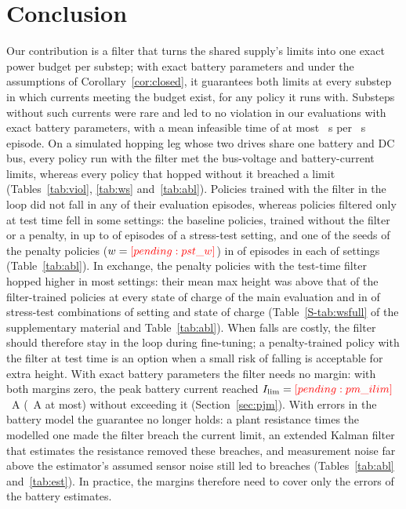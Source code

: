 \section{Conclusion}\label{sec:conclusion}
Our contribution is a filter that turns the shared supply's limits into one exact power budget per substep; with exact battery parameters and under the assumptions of Corollary~\ref{cor:closed}, it guarantees both limits at every substep in which currents meeting the budget exist, for any policy it runs with. Substeps without such currents were rare and led to no violation in our evaluations with exact battery parameters, with a mean infeasible time of at most ~s per ~s episode. On a simulated hopping leg whose two drives share one battery and DC bus, every policy run with the filter met the bus-voltage and battery-current limits, whereas every policy that hopped without it breached a limit (Tables~\ref{tab:viol}, \ref{tab:ws} and~\ref{tab:abl}). Policies trained with the filter in the loop did not fall in any of their  evaluation episodes, whereas policies filtered only at test time fell in some settings: the baseline policies, trained without the filter or a penalty, in up to  of  episodes of a stress-test setting, and one of the  seeds of the penalty policies ($w=\res{pst_w}$) in  of  episodes in each of  settings (Table~\ref{tab:abl}). In exchange, the penalty policies with the test-time filter hopped higher in most settings: their mean max height was above that of the filter-trained policies at every state of charge of the main evaluation and in  of  stress-test combinations of setting and state of charge (Table~\ref{S-tab:wsfull} of the supplementary material and Table~\ref{tab:abl}). When falls are costly, the filter should therefore stay in the loop during fine-tuning; a penalty-trained policy with the filter at test time is an option when a small risk of falling is acceptable for extra height. With exact battery parameters the filter needs no margin: with both margins zero, the peak battery current reached $I_{\lim}=\res{pm_ilim}$~A (~A at most) without exceeding it (Section~\ref{sec:pjm}). With errors in the battery model the guarantee no longer holds: a plant resistance  times the modelled one made the filter breach the current limit, an extended Kalman filter that estimates the resistance removed these breaches, and measurement noise far above the estimator's assumed sensor noise still led to breaches (Tables~\ref{tab:abl} and~\ref{tab:est}). In practice, the margins therefore need to cover only the errors of the battery estimates.
